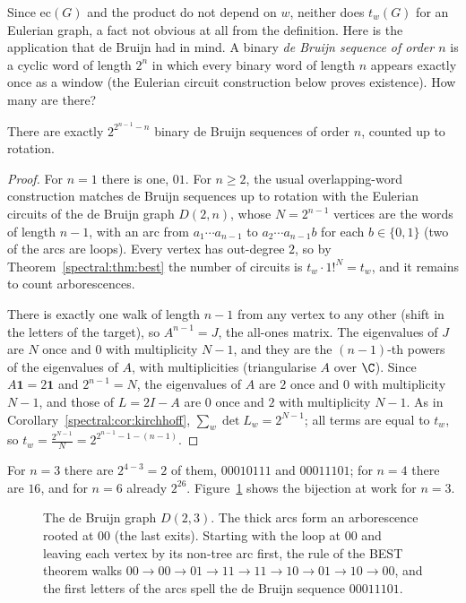 Since $\mathrm{ec}(G)$ and the product do not depend on $w$, neither does $t_w(G)$ for an Eulerian graph, a fact not obvious at all from the definition. Here is the application that de Bruijn
had in mind. A binary \emph{de Bruijn sequence of order $n$} is a cyclic word of length $2^n$ in which every binary word of length $n$ appears exactly once as a window
(the Eulerian circuit construction below proves existence). How many are there?

\begin{corollary}\label{spectral:cor:debruijncount}
There are exactly $2^{2^{n-1}-n}$ binary de Bruijn sequences of order $n$, counted up to rotation.
\end{corollary}
\begin{proof}
For $n=1$ there is one, $01$. For $n\ge2$, the usual overlapping-word construction matches de Bruijn sequences up to rotation with the Eulerian circuits of the de Bruijn graph $D(2,n)$, whose $N=2^{n-1}$
vertices are the words of length $n-1$, with an arc from $a_1\cdots a_{n-1}$ to $a_2\cdots a_{n-1}b$ for each $b\in\{0,1\}$ (two of the arcs are loops). Every vertex has out-degree $2$, so by
Theorem~\ref{spectral:thm:best} the number of circuits is $t_w\cdot1!^N=t_w$, and it remains to count arborescences.

There is exactly one walk of length $n-1$ from any vertex to any other (shift in the letters of the target), so $A^{n-1}=J$, the all-ones matrix. The eigenvalues of $J$ are $N$ once and $0$
with multiplicity $N-1$, and they are the $(n-1)$-th powers of the eigenvalues of $A$, with multiplicities (triangularise $A$ over $\C$). Since $A\mathbf1=2\mathbf1$ and $2^{n-1}=N$, the eigenvalues
of $A$ are $2$ once and $0$ with multiplicity $N-1$, and those of $L=2I-A$ are $0$ once and $2$ with multiplicity $N-1$. As in Corollary~\ref{spectral:cor:kirchhoff}, $\sum_w\det L_w=2^{N-1}$; all terms are equal
to $t_w$, so $t_w=\frac{2^{N-1}}N=2^{2^{n-1}-1-(n-1)}$.
\end{proof}

For $n=3$ there are $2^{4-3}=2$ of them, $00010111$ and $00011101$; for $n=4$ there are $16$, and for $n=6$ already $2^{26}$. Figure~\ref{spectral:fig:best} shows the bijection at work for $n=3$.

\begin{figure}[ht]
\centering
{}
\caption{The de Bruijn graph $D(2,3)$. The thick arcs form an arborescence rooted at $00$ (the last exits). Starting with the loop at $00$ and leaving each vertex by its
non-tree arc first, the rule of the BEST theorem walks $00\to00\to01\to11\to11\to10\to01\to10\to00$, and the first letters of the arcs spell the de Bruijn sequence $00011101$.}
\label{spectral:fig:best}
\end{figure}


